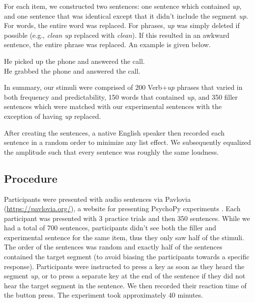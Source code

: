 \documentclass[
  authoryear,
  preprint,
  1p,
  onecolumn]{elsarticle}
\begin{document}
For each item, we constructed two sentences: one sentence which
contained \emph{up}, and one sentence that was identical except that it
didn't include the segment \emph{up.} For words, the entire word was
replaced. For phrases, \emph{up} was simply deleted if possible (e.g.,
\emph{clean up} replaced with \emph{clean}). If this resulted in an
awkward sentence, the entire phrase was replaced. An example is given
below.

\begin{exe} 
\ex
  \begin{xlist}
    \ex He picked up the phone and answered the call. \\
    \ex He grabbed the phone and answered the call. \\
  \end{xlist}
\end{exe}

In summary, our stimuli were comprised of 200 Verb+\emph{up} phrases
that varied in both frequency and predictability, 150 words that
contained \emph{up}, and 350 filler sentences which were matched with
our experimental sentences with the exception of having \emph{up}
replaced.

After creating the sentences, a native English speaker then recorded
each sentence in a random order to minimize any list effect. We
subsequently equalized the amplitude such that every sentence was
roughly the same loudness.

\subsection{Procedure}\label{procedure}

Participants were presented with audio sentences via Pavlovia
(\url{https://pavlovia.org/}), a website for presenting PsychoPy
experiments \citep{peircePsychoPy2ExperimentsBehavior2019}. Each
participant was presented with 3 practice trials and then 350 sentences.
While we had a total of 700 sentences, participants didn't see both the
filler and experimental sentence for the same item, thus they only saw
half of the stimuli. The order of the sentences was random and exactly
half of the sentences contained the target segment (to avoid biasing the
participants towards a specific response). Participants were instructed
to press a key as soon as they heard the segment \emph{up}, or to press
a separate key at the end of the sentence if they did not hear the
target segment in the sentence. We then recorded their reaction time of
the button press. The experiment took approximately 40 minutes.
\end{document}
